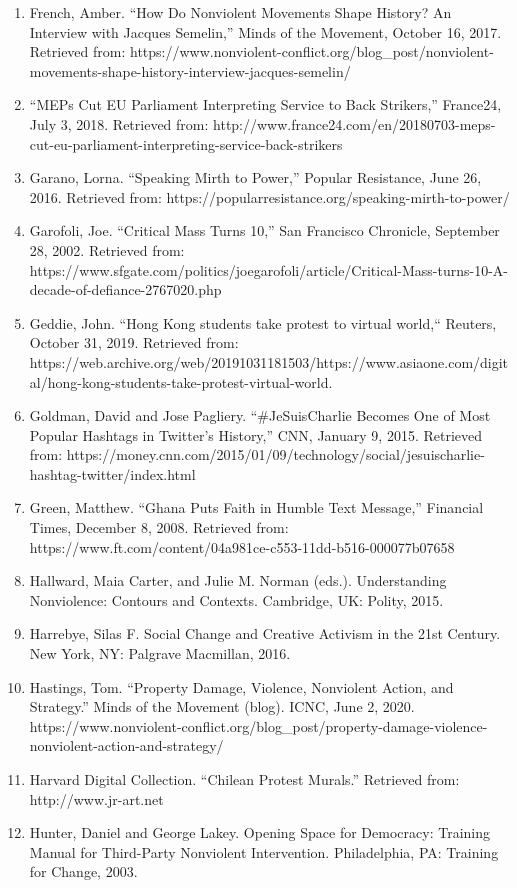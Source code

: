 \documentclass[twoside,a4paper,12pt,fleqn,openany]{extbook}
\begin{document}
\begin{enumerate}
\item French, Amber. “How Do Nonviolent Movements Shape History? An Interview with Jacques Semelin,” Minds of the Movement, October 16, 2017. Retrieved from: https://www.nonviolent-conflict.org/blog_post/nonviolent-movements-shape-history-interview-jacques-semelin/
\item “MEPs Cut EU Parliament Interpreting Service to Back Strikers,” France24, July 3, 2018. Retrieved from: http://www.france24.com/en/20180703-meps-cut-eu-parliament-interpreting-service-back-strikers
\item Garano, Lorna. “Speaking Mirth to Power,” Popular Resistance, June 26, 2016. Retrieved from: https://popularresistance.org/speaking-mirth-to-power/
\item Garofoli, Joe. “Critical Mass Turns 10,” San Francisco Chronicle, September 28, 2002. Retrieved from: https://www.sfgate.com/politics/joegarofoli/article/Critical-Mass-turns-10-A-decade-of-defiance-2767020.php
\item Geddie, John. “Hong Kong students take protest to virtual world,“ Reuters, October 31, 2019. Retrieved from: https://web.archive.org/web/20191031181503/https://www.asiaone.com/digital/hong-kong-students-take-protest-virtual-world.
\item Goldman, David and Jose Pagliery. “#JeSuisCharlie Becomes One of Most Popular Hashtags in Twitter’s History,” CNN, January 9, 2015. Retrieved from: https://money.cnn.com/2015/01/09/technology/social/jesuischarlie-hashtag-twitter/index.html
\item Green, Matthew. “Ghana Puts Faith in Humble Text Message,” Financial Times, December 8,
2008. Retrieved from: https://www.ft.com/content/04a981ce-c553-11dd-b516-000077b07658
\item Hallward, Maia Carter, and Julie M. Norman (eds.). Understanding Nonviolence: Contours and Contexts. Cambridge, UK: Polity, 2015.
\item Harrebye, Silas F. Social Change and Creative Activism in the 21st Century. New York, NY: Palgrave Macmillan, 2016.
\item Hastings, Tom. “Property Damage, Violence, Nonviolent Action, and Strategy.” Minds of the Movement (blog). ICNC, June 2, 2020. https://www.nonviolent-conflict.org/blog_post/property-damage-violence-nonviolent-action-and-strategy/
\item Harvard Digital Collection. “Chilean Protest Murals.” Retrieved from: http://www.jr-art.net
\item Hunter, Daniel and George Lakey. Opening Space for Democracy: Training Manual for Third-Party Nonviolent Intervention. Philadelphia, PA: Training for Change, 2003.

\end{enumerate}
\end{document}
